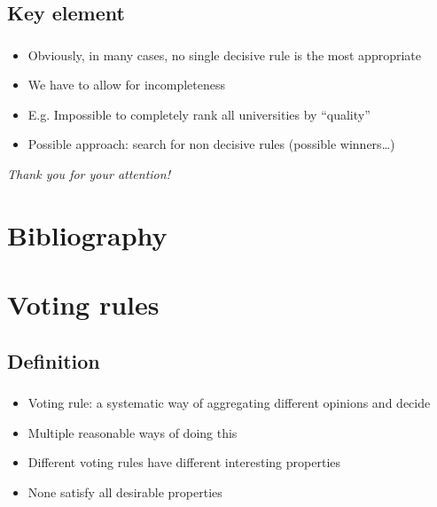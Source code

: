 \documentclass[french,english]{beamer}
\begin{document}
\subsection{Key element}
\begin{frame}
	\frametitle{\subsecname}
	\begin{itemize}
		\item Obviously, in many cases, no single decisive rule is the most appropriate
		\item We have to allow for incompleteness
		\item E.g. Impossible to completely rank all universities by “quality”
		\item Possible approach: search for non decisive rules (possible winners…)
	\end{itemize}
\end{frame}

\begin{frame}[plain]
	\addtocounter{framenumber}{-1}
	\begin{center}
		\huge
		\textit{Thank you for your attention!}
	\end{center}
\end{frame}

\appendix
\AtBeginSection{
}

\section{Bibliography}
\begin{frame}[allowframebreaks]
	\frametitle{\secname}
	\def\newblock{\hskip .11em plus .33em minus .07em}
 	
\end{frame}

\section{Voting rules}
\subsection{Definition}
\begin{frame}
	\frametitle{\subsecname}
	\begin{itemize}
		\item Voting rule: a systematic way of aggregating different opinions and decide
		\item Multiple reasonable ways of doing this
		\item Different voting rules have different interesting properties
		\item None satisfy all desirable properties
	\end{itemize}
\end{frame}
\end{document}
